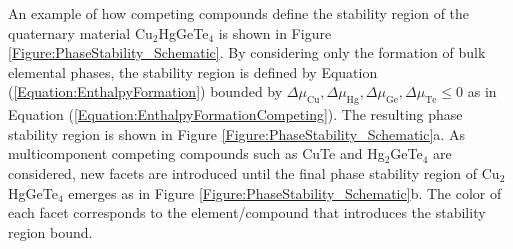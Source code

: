 \documentclass[%
 reprint,
 amsmath,amssymb,
 aps,
]{revtex4-1}
\begin{document}
An example of how competing compounds define the stability region of the quaternary material Cu$_2$HgGeTe$_4$ is shown in Figure \ref{Figure:PhaseStability_Schematic}. By considering only the formation of bulk elemental phases, the stability region is defined by Equation (\ref{Equation:EnthalpyFormation}) bounded by $\Delta \mu_{\text{Cu}}, \Delta \mu_{\text{Hg}}, \Delta \mu_{\text{Ge}}, \Delta \mu_{\text{Te}} \leq 0$ as in Equation (\ref{Equation:EnthalpyFormationCompeting}). The resulting phase stability region is shown in Figure \ref{Figure:PhaseStability_Schematic}a. As multicomponent competing compounds such as CuTe and Hg$_2$GeTe$_4$ are considered, new facets are introduced until the final phase stability region of Cu$_2$HgGeTe$_4$ emerges as in Figure \ref{Figure:PhaseStability_Schematic}b. The color of each facet corresponds to the element/compound that introduces the stability region bound.
\end{document}

